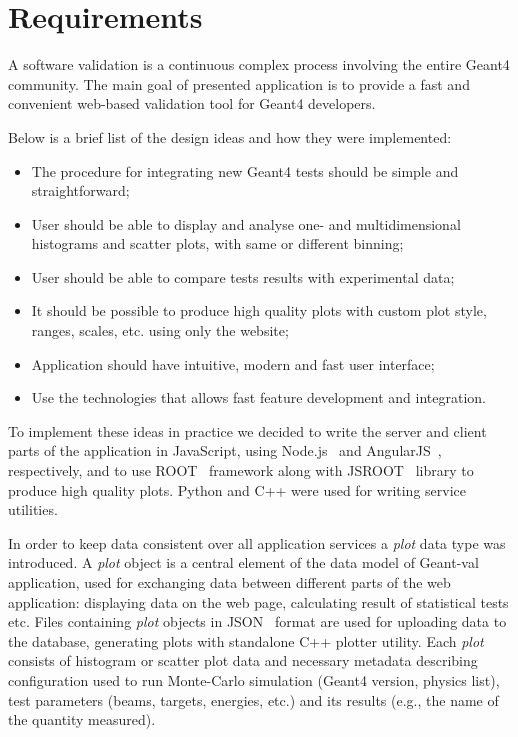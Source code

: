 \section{Requirements}
\label{sec:requirements}

A software validation is a continuous complex process involving the entire Geant4 community. The main goal of presented application is to provide a fast and convenient web-based validation tool for Geant4 developers.

Below is a brief list of the design ideas
and how they were implemented:
\begin{itemize}
    \item The procedure for integrating new Geant4 tests should be simple and straightforward;
    \item User should be able to display and analyse one- and multidimensional histograms and scatter plots, with same or different binning;
    \item User should be able to compare tests results with experimental data;
    \item It should be possible to produce high quality plots with custom plot style, ranges, scales, etc. using only the website;
    \item Application should have intuitive, modern and fast user interface;
    \item Use the technologies that allows fast feature development and integration.
\end{itemize}

To implement these ideas in practice we decided to write the server and client parts of the application in JavaScript, using Node.js~\cite{NodeJS} and AngularJS~\cite{AngularJS}, respectively, and to use ROOT~\cite{ROOT} framework along with JSROOT~\cite{JSROOT} library to produce high quality plots. Python and C++ were used for writing service utilities.

In order to keep data consistent over all application services a \textit{plot} data type was introduced. A \textit{plot} object is a central element of the data model of \textsf{Geant-val} application, used for exchanging data between different parts of the web application: displaying data on the web page, calculating result of statistical tests etc. Files containing \textit{plot} objects in JSON~\cite{json} format are used for uploading data to the database, generating plots with standalone C++ plotter utility. 
Each \textit{plot} consists of histogram or scatter plot data and necessary metadata describing configuration used to run Monte-Carlo simulation (Geant4 version, physics list), test parameters (beams, targets, energies, etc.) and its results (e.g., the name of the quantity measured).

